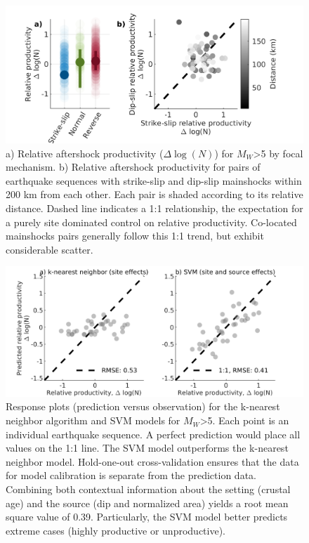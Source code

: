 \documentclass[draft]{agujournal}
\begin{document}
\begin{figure}
\centering
\includegraphics{figures/fmspairs_mw5.png}
\caption{a) Relative aftershock productivity  ($\Delta \log(N)$) for $M_W$>5 by focal mechanism. b) Relative aftershock productivity for pairs of earthquake sequences with strike-slip and dip-slip mainshocks within 200 km from each other. Each pair is shaded according to its relative distance. Dashed line indicates a 1:1 relationship, the expectation for a purely site dominated control on relative productivity. Co-located mainshocks pairs generally follow this 1:1 trend, but exhibit considerable scatter.}
\end{figure}

\begin{figure}
\centering
\includegraphics{figures/response_mw5.png}
\caption{Response plots (prediction versus observation) for the k-nearest neighbor algorithm and SVM models for $M_W$>5. Each point is an individual earthquake sequence. A perfect prediction would place all values on the 1:1 line. The SVM model outperforms the k-nearest neighbor model. Hold-one-out cross-validation ensures that the data for model calibration is separate from the prediction data. Combining both contextual information about the setting (crustal age) and the source (dip and normalized area) yields a root mean square value of 0.39. Particularly, the SVM model better predicts extreme cases (highly productive or unproductive).}
\label{fig:response}
\end{figure}
\end{document}
